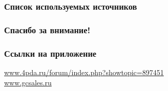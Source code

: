 \documentclass{beamer}
\begin{document}
\begin{frame}
    \frametitle{Список используемых источников}
    \nocite{*}
    \printbibliography{}
\end{frame}

\begin{frame}[c]
\begin{center}
\frametitle{\LARGE Спасибо за внимание!}

{\LARGE \inserttitle}

\bigskip

{\insertauthor}

\bigskip\bigskip

{\insertinstitute}

\bigskip\bigskip

{\large \insertdate}
\end{center}
\end{frame}

\begin{frame}[c]
\begin{center}
\frametitle{\LARGE Ссылки на приложение}

    \url{www.4pda.ru/forum/index.php?showtopic=897451}
    \bigskip\\
    \bigskip\bigskip
    \url{www.gcsales.ru}

\end{center}
\end{frame}
\end{document}
